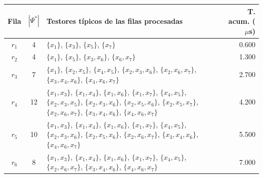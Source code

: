 \begin{tabular}{c c >{\raggedright\arraybackslash}p{9.5cm} r}
\toprule
Fila & $|\Psi^*|$ & Testores típicos de las filas procesadas & T. acum. ($\mu$s) \\
\midrule
$r_{1}$ & 4 & $\{x_{1}\}$, $\{x_{3}\}$, $\{x_{5}\}$, $\{x_{7}\}$ & 0.600 \\
$r_{2}$ & 4 & $\{x_{1}\}$, $\{x_{5}\}$, $\{x_{3},x_{6}\}$, $\{x_{6},x_{7}\}$ & 1.300 \\
$r_{3}$ & 7 & $\{x_{1}\}$, $\{x_{2},x_{5}\}$, $\{x_{4},x_{5}\}$, $\{x_{2},x_{3},x_{6}\}$, $\{x_{2},x_{6},x_{7}\}$, $\{x_{3},x_{4},x_{6}\}$, $\{x_{4},x_{6},x_{7}\}$ & 2.700 \\
$r_{4}$ & 12 & $\{x_{1},x_{3}\}$, $\{x_{1},x_{4}\}$, $\{x_{1},x_{6}\}$, $\{x_{1},x_{7}\}$, $\{x_{4},x_{5}\}$, $\{x_{2},x_{3},x_{5}\}$, $\{x_{2},x_{3},x_{6}\}$, $\{x_{2},x_{5},x_{6}\}$, $\{x_{2},x_{5},x_{7}\}$, $\{x_{2},x_{6},x_{7}\}$, $\{x_{3},x_{4},x_{6}\}$, $\{x_{4},x_{6},x_{7}\}$ & 4.200 \\
$r_{5}$ & 10 & $\{x_{1},x_{3}\}$, $\{x_{1},x_{4}\}$, $\{x_{1},x_{6}\}$, $\{x_{1},x_{7}\}$, $\{x_{4},x_{5}\}$, $\{x_{2},x_{3},x_{6}\}$, $\{x_{2},x_{5},x_{6}\}$, $\{x_{2},x_{6},x_{7}\}$, $\{x_{3},x_{4},x_{6}\}$, $\{x_{4},x_{6},x_{7}\}$ & 5.500 \\
$r_{6}$ & 8 & $\{x_{1},x_{3}\}$, $\{x_{1},x_{4}\}$, $\{x_{1},x_{6}\}$, $\{x_{1},x_{7}\}$, $\{x_{4},x_{5}\}$, $\{x_{2},x_{6},x_{7}\}$, $\{x_{3},x_{4},x_{6}\}$, $\{x_{4},x_{6},x_{7}\}$ & 7.000 \\
\bottomrule
\end{tabular}
